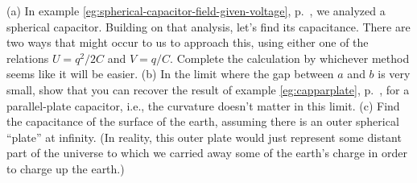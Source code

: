 (a) In example \ref{eg:spherical-capacitor-field-given-voltage},
p.~\pageref{eg:spherical-capacitor-field-given-voltage},
we analyzed a spherical capacitor. Building on that analysis,
let's find its capacitance.
There are two ways that might occur to us to approach this,
using either one of the relations $U=q^2/2C$ and $V=q/C$.
Complete the calculation by whichever method seems like it
will be easier.\answercheck\hwendpart
(b) In the limit where the gap between $a$ and $b$ is very small,
show that you can recover the result of example \ref{eg:capparplate}, p.~\pageref{eg:capparplate}, for
a parallel-plate capacitor, i.e., the curvature doesn't matter in this limit.\hwendpart
(c) Find the capacitance of the surface of the
earth, assuming there is an outer spherical ``plate'' at infinity.
(In reality, this outer plate would just represent some distant
part of the universe to which we carried away some of the earth's charge
in order to charge up the earth.)\answercheck

